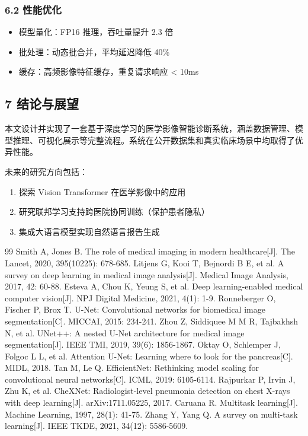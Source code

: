 \documentclass{harryopo-paper}
\begin{document}
\subsubsection*{6.2 性能优化}

\begin{itemize}
  \item {\fzht 模型量化}：FP16 推理，吞吐量提升 2.3 倍
  \item {\fzht 批处理}：动态批合并，平均延迟降低 40\%
  \item {\fzht 缓存}：高频影像特征缓存，重复请求响应 < 10ms
\end{itemize}

\subsection*{7 结论与展望}

本文设计并实现了一套基于深度学习的医学影像智能诊断系统，涵盖数据管理、模型推理、可视化展示等完整流程。系统在公开数据集和真实临床场景中均取得了优异性能。

未来的研究方向包括：

\begin{enumerate}
  \item 探索 Vision Transformer 在医学影像中的应用
  \item 研究联邦学习支持跨医院协同训练（保护患者隐私）
  \item 集成大语言模型实现自然语言报告生成
\end{enumerate}

\begin{thebibliography}{99}
 Smith A, Jones B. The role of medical imaging in modern healthcare[J]. The Lancet, 2020, 395(10225): 678-685.
 Litjens G, Kooi T, Bejnordi B E, et al. A survey on deep learning in medical image analysis[J]. Medical Image Analysis, 2017, 42: 60-88.
 Esteva A, Chou K, Yeung S, et al. Deep learning-enabled medical computer vision[J]. NPJ Digital Medicine, 2021, 4(1): 1-9.
 Ronneberger O, Fischer P, Brox T. U-Net: Convolutional networks for biomedical image segmentation[C]. MICCAI, 2015: 234-241.
 Zhou Z, Siddiquee M M R, Tajbakhsh N, et al. UNet++: A nested U-Net architecture for medical image segmentation[J]. IEEE TMI, 2019, 39(6): 1856-1867.
 Oktay O, Schlemper J, Folgoc L L, et al. Attention U-Net: Learning where to look for the pancreas[C]. MIDL, 2018.
 Tan M, Le Q. EfficientNet: Rethinking model scaling for convolutional neural networks[C]. ICML, 2019: 6105-6114.
 Rajpurkar P, Irvin J, Zhu K, et al. CheXNet: Radiologist-level pneumonia detection on chest X-rays with deep learning[J]. arXiv:1711.05225, 2017.
 Caruana R. Multitask learning[J]. Machine Learning, 1997, 28(1): 41-75.
 Zhang Y, Yang Q. A survey on multi-task learning[J]. IEEE TKDE, 2021, 34(12): 5586-5609.
\end{thebibliography}
\end{document}
